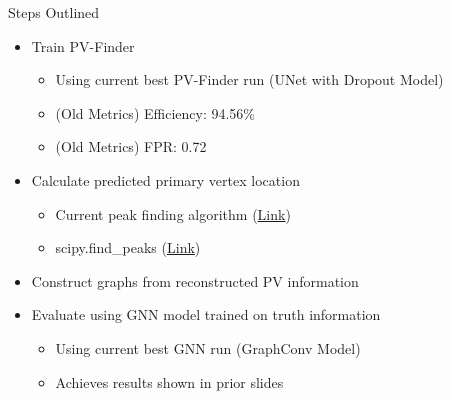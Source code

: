 \documentclass[xcolor=table,aspectratio=169]{beamer}
\begin{document}
\begin{frame}{Steps Outlined}
    \begin{itemize}
        \item Train PV-Finder
        \begin{itemize}
            \item Using current best PV-Finder run (UNet with Dropout Model)
            \item (Old Metrics) Efficiency: 94.56\%
            \item (Old Metrics) FPR: 0.72
        \end{itemize}
        \item Calculate predicted primary vertex location
        \begin{itemize}
            \item Current peak finding algorithm (\href{https://gitlab.cern.ch/qlei/atlas_pvfinder/-/blob/master/model/efficiency_res_optimized_atlas.py?ref_type=heads}{Link})
            \item scipy.find\_peaks (\href{https://docs.scipy.org/doc/scipy/reference/generated/scipy.signal.find_peaks.html}{Link})
        \end{itemize}
        \item Construct graphs from reconstructed PV information
        \item Evaluate using GNN model trained on truth information
        \begin{itemize}
            \item Using current best GNN run (GraphConv Model)
            \item Achieves results shown in prior slides
        \end{itemize}
    \end{itemize}
\end{frame}
\end{document}
